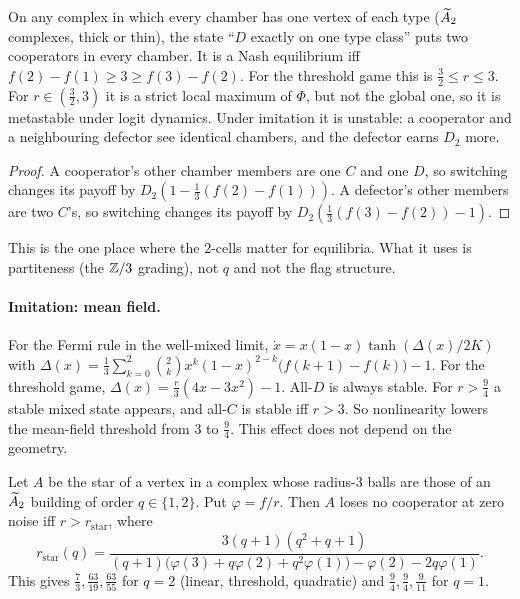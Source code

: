 \begin{proposition}\label{V3P5:prop:typeNash}
On any complex in which every chamber has one vertex of each type ($\widetilde A_2$ complexes, thick or
thin), the state ``$D$ exactly on one type class'' puts two cooperators in every chamber. It is a
Nash equilibrium iff $f(2)-f(1)\ge3\ge f(3)-f(2)$. For the threshold game this is
$\frac32\le r\le3$. For $r\in(\frac32,3)$ it is a strict local maximum of $\Phi$, but not the
global one, so it is metastable under logit dynamics. Under imitation it is unstable: a
cooperator and a neighbouring defector see identical chambers, and the defector earns $D_2$
more.
\end{proposition}

\begin{proof}
A cooperator's other chamber members are one $C$ and one $D$, so switching changes its payoff by
$D_2(1-\frac13(f(2)-f(1)))$. A defector's other members are two $C$'s, so switching changes its
payoff by $D_2(\frac13(f(3)-f(2))-1)$.
\end{proof}

This is the one place where the $2$-cells matter for equilibria. What it uses is
partiteness (the $\mathbb{Z}/3$ grading), not $q$ and not the flag structure.

\paragraph{Imitation: mean field.} For the Fermi rule in the well-mixed limit,
$\dot x=x(1-x)\tanh(\Delta(x)/2K)$ with
$\Delta(x)=\frac13\sum_{k=0}^{2}\binom2kx^{k}(1-x)^{2-k}\bigl(f(k+1)-f(k)\bigr)-1$. For the threshold
game, $\Delta(x)=\frac r3(4x-3x^{2})-1$. All-$D$ is always stable. For $r>\frac94$ a stable mixed
state appears, and all-$C$ is stable iff $r>3$. So nonlinearity lowers the mean-field threshold
from $3$ to $\frac94$. This effect does not depend on the geometry.

\begin{proposition}\label{V3P5:prop:starNL}
Let $A$ be the star of a vertex in a complex whose radius-$3$ balls are those of an $\widetilde A_2$
building of order $q\in\{1,2\}$. Put $\varphi=f/r$. Then $A$ loses no cooperator at zero noise iff
$r>r_{\mathrm{star}}$, where
\[
r_{\mathrm{star}}(q)=\frac{3(q+1)(q^{2}+q+1)}{(q+1)\bigl(\varphi(3)+q\varphi(2)+q^{2}\varphi(1)\bigr)-\varphi(2)-2q\varphi(1)}.
\]
This gives $\frac73,\frac{63}{19},\frac{63}{55}$ for $q=2$ (linear, threshold, quadratic) and
$\frac94,\frac94,\frac9{11}$ for $q=1$.
\end{proposition}

